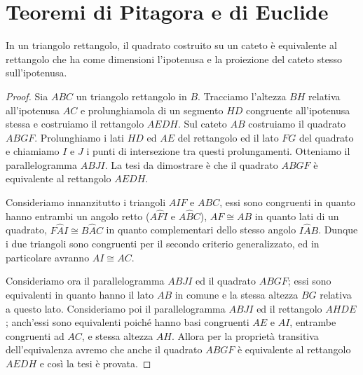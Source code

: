 \section{Teoremi di Pitagora e di Euclide}
\label{sect:teoremi_pitagora_euclide}

\begin{teorema}
In un triangolo rettangolo, il quadrato costruito su un cateto è 
equivalente al rettangolo che ha come dimensioni l'ipotenusa e la 
proiezione del cateto stesso sull'ipotenusa.
\end{teorema}


\noindent\begin{minipage}{0.63\textwidth}\parindent15pt
\begin{proof}
Sia \(ABC\) un triangolo rettangolo in \(B\). Tracciamo l'altezza \(BH\) 
relativa all'ipotenusa \(AC\) e prolunghiamola di un segmento \(HD\) 
congruente all'ipotenusa stessa e costruiamo il rettangolo \(AEDH\). 
Sul cateto \(AB\) costruiamo il quadrato \(ABGF\). Prolunghiamo i lati 
\(HD\) ed \(AE\) del rettangolo ed il lato \(FG\) del quadrato e chiamiamo 
\(I\) e \(J\) i punti di intersezione tra questi prolungamenti. Otteniamo 
il parallelogramma \(ABJI\).
La tesi da dimostrare è che il quadrato \(ABGF\) è equivalente al 
rettangolo \(AEDH\).

Consideriamo innanzitutto i triangoli \(AIF\) e \(ABC\), essi sono 
congruenti in quanto hanno entrambi un angolo retto (\(A\widehat{F}I\) 
e \(A\widehat{B}C\)), \(AF\cong AB\) in quanto lati di un quadrato, 
\(F\widehat{A}I\cong B\widehat{A}C\) in quanto complementari dello 
stesso angolo \(I\widehat{A}B\).
Dunque i due triangoli sono congruenti per il secondo criterio 
generalizzato, ed in particolare avranno \(AI\cong AC\).

Consideriamo ora il parallelogramma \(ABJI\) ed il quadrato \(ABGF\); 
essi sono equivalenti in quanto hanno il lato \(AB\) in comune e la 
stessa altezza \(BG\) relativa a questo lato. 
Consideriamo poi il parallelogramma \(ABJI\) ed il rettangolo \(AHDE\); 
anch'essi sono equivalenti poiché hanno basi congruenti \(AE\) e \(AI\), 
entrambe congruenti ad \(AC\), e stessa altezza \(AH\).
Allora per la proprietà transitiva dell'equivalenza avremo che anche 
il quadrato \(ABGF\) è equivalente al rettangolo \(AEDH\) e così la tesi 
è provata.
\end{proof}
\end{minipage}\hfil
\begin{minipage}{0.37\textwidth}
  \centering
\end{minipage}\vspace{8pt}


